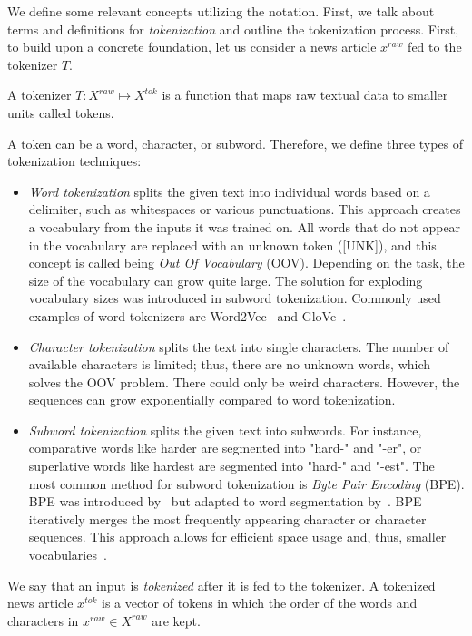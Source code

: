We define some relevant concepts utilizing the notation. First, we talk about terms and definitions for \emph{tokenization} and outline the tokenization process. First, to build upon a concrete foundation, let us consider a news article $x^{raw}$ fed to the tokenizer $T$.
\begin{definition}
    A tokenizer $T:X^{raw} \mapsto X^{tok}$ is a function that maps raw textual data to smaller units called tokens.
\end{definition}
A token can be a word, character, or subword. Therefore, we define three types of tokenization techniques:
\begin{itemize}
    \item \emph{Word tokenization} splits the given text into individual words based on a delimiter, such as whitespaces or various punctuations. This approach creates a vocabulary from the inputs it was trained on. All words that do not appear in the vocabulary are replaced with an unknown token ([UNK]), and this concept is called being \emph{Out Of Vocabulary} (OOV). Depending on the task, the size of the vocabulary can grow quite large. The solution for exploding vocabulary sizes was introduced in subword tokenization. Commonly used examples of word tokenizers are Word2Vec~\parencite{Word2Vec_Mikolov} and GloVe~\parencite{GloVe_Pennington}.
    \item \emph{Character tokenization} splits the text into single characters. The number of available characters is limited; thus, there are no unknown words, which solves the OOV problem. There could only be weird characters. However, the sequences can grow exponentially compared to word tokenization.
    \item \emph{Subword tokenization} splits the given text into subwords. For instance, comparative words like harder are segmented into "hard-" and "-er", or superlative words like hardest are segmented into "hard-" and "-est". The most common method for subword tokenization is \emph{Byte Pair Encoding} (BPE). BPE was introduced by~\cite{ANewAlgorithmForDataCompression_Gage} but adapted to word segmentation by~\cite{NeuralMachineTranslationOfRareWords_Sennrich}. BPE iteratively merges the most frequently appearing character or character sequences. This approach allows for efficient space usage and, thus, smaller vocabularies~\parencite{NeuralMachineTranslationOfRareWords_Sennrich}.
\end{itemize}
We say that an input is \emph{tokenized} after it is fed to the tokenizer. A tokenized news article $x^{tok}$ is a vector of tokens in which the order of the words and characters in $x^{raw} \in X^{raw}$ are kept.
